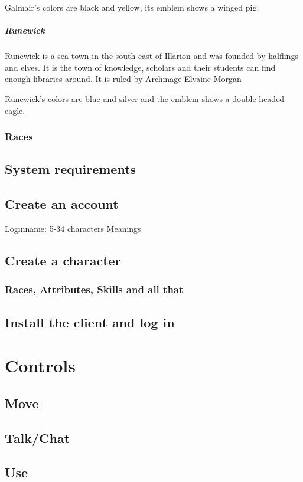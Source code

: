 \documentclass[a4paper,11pt]{scrreprt}
\begin{document}
Galmair's colors are black and yellow, its emblem shows a winged pig. 

\paragraph{Runewick}
Runewick is a sea town in the south east of Illarion and was founded by halflings and elves.
It is the town of knowledge, scholars and their students can find enough libraries around. 
It is ruled by Archmage Elvaine Morgan 

Runewick's colors are blue and silver and the emblem shows a double headed eagle.

\subsection{Races}
\section{System requirements}
\section{Create an account}
Loginname: 5-34 characters
Meanings
\section{Create a character}
\subsection{Races, Attributes, Skills and all that}
\section{Install the client and log in}

\chapter{Controls}
\section{Move}
\section{Talk/Chat}
\section{Use}
\end{document}

